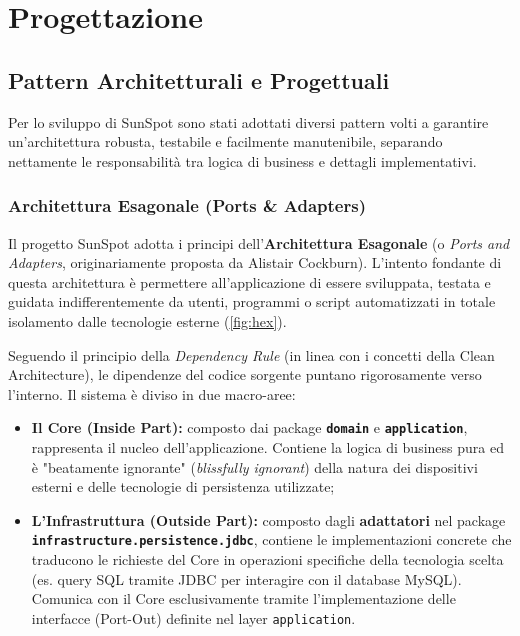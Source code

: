 \documentclass[a4paper,11pt]{article}
\begin{document}
\newpage

\section{Progettazione}
\label{cap:Progettazione}

\subsection{Pattern Architetturali e Progettuali}
\label{cap:Pattern}

Per lo sviluppo di SunSpot sono stati adottati diversi pattern volti a garantire un'architettura robusta, testabile e facilmente manutenibile, separando nettamente le responsabilità tra logica di business e dettagli implementativi.

\subsubsection{Architettura Esagonale (Ports \& Adapters)}
Il progetto SunSpot adotta i principi dell'\textbf{Architettura Esagonale} (o \textit{Ports and Adapters}, originariamente proposta da Alistair Cockburn). L'intento fondante di questa architettura è permettere all'applicazione di essere sviluppata, testata e guidata indifferentemente da utenti, programmi o script automatizzati in totale isolamento dalle tecnologie esterne (\autoref{fig:hex}).

Seguendo il principio della \textit{Dependency Rule} (in linea con i concetti della Clean Architecture), le dipendenze del codice sorgente puntano rigorosamente verso l'interno. Il sistema è diviso in due macro-aree:
\begin{itemize}
	\item \textbf{Il Core (Inside Part):} composto dai package \textbf{\texttt{domain}} e \textbf{\texttt{application}}, rappresenta il nucleo dell'applicazione. Contiene la logica di business pura ed è "beatamente ignorante" (\textit{blissfully ignorant}) della natura dei dispositivi esterni e delle tecnologie di persistenza utilizzate;
	\item \textbf{L'Infrastruttura (Outside Part):} composto dagli \textbf{adattatori} nel package \\ \textbf{\texttt{infrastructure.persistence.jdbc}}, contiene le implementazioni concrete che traducono le richieste del Core in operazioni specifiche della tecnologia scelta (es. query SQL tramite JDBC per interagire con il database MySQL). Comunica con il Core esclusivamente tramite l'implementazione delle interfacce (Port-Out) definite nel layer \texttt{application}.
\end{itemize}
\end{document}
